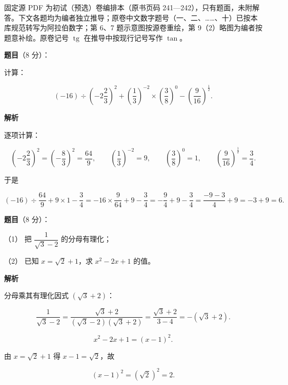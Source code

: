 

\begin{gktip}
固定源 PDF 为初试（预选）卷编排本（原书页码 241—242），只有题面，未附解答。下文各题均为编者独立推导；原卷中文数字题号（一、二、……、十）已按本库规范转写为阿拉伯数字；第 6、7 题示意图按源卷重绘，第 9（2）略图为编者按题意补绘。原卷记号 $\operatorname{tg}$ 在推导中按现行记号写作 $\tan$。
\end{gktip}

\begin{answer}

\textbf{题目}（8 分）：

计算：

\nopagebreak[4]
\[
(-16)\div\left(-2\frac{2}{3}\right)^2+\left(\frac{1}{3}\right)^{-2}\times\left(\frac{3}{8}\right)^0-\left(\frac{9}{16}\right)^{\frac{1}{2}}.
\]

\textbf{解析}

逐项计算：

\nopagebreak[4]
\[
\left(-2\frac{2}{3}\right)^2=\left(-\frac{8}{3}\right)^2=\frac{64}{9},\qquad
\left(\frac{1}{3}\right)^{-2}=9,\qquad
\left(\frac{3}{8}\right)^0=1,\qquad
\left(\frac{9}{16}\right)^{\frac{1}{2}}=\frac{3}{4}.
\]

于是

\nopagebreak[4]
\[
(-16)\div\frac{64}{9}+9\times1-\frac{3}{4}
=-16\times\frac{9}{64}+9-\frac{3}{4}
=-\frac{9}{4}+9-\frac{3}{4}
=\frac{-9-3}{4}+9
=-3+9=6.
\]


\end{answer}
\begin{answer}

\textbf{题目}（8 分）：

（1） 把 $\dfrac{1}{\sqrt{3}-2}$ 的分母有理化；

（2） 已知 $x=\sqrt{2}+1$，求 $x^2-2x+1$ 的值。

\textbf{解析}


分母乘其有理化因式 $(\sqrt{3}+2)$：

\nopagebreak[4]
\[
\frac{1}{\sqrt{3}-2}
=\frac{\sqrt{3}+2}{(\sqrt{3}-2)(\sqrt{3}+2)}
=\frac{\sqrt{3}+2}{3-4}
=-(\sqrt{3}+2).
\]


\nopagebreak[4]
\[
x^2-2x+1=(x-1)^2.
\]

由 $x=\sqrt{2}+1$ 得 $x-1=\sqrt{2}$，故

\nopagebreak[4]
\[
(x-1)^2=(\sqrt{2})^2=2.
\]



\end{answer}
